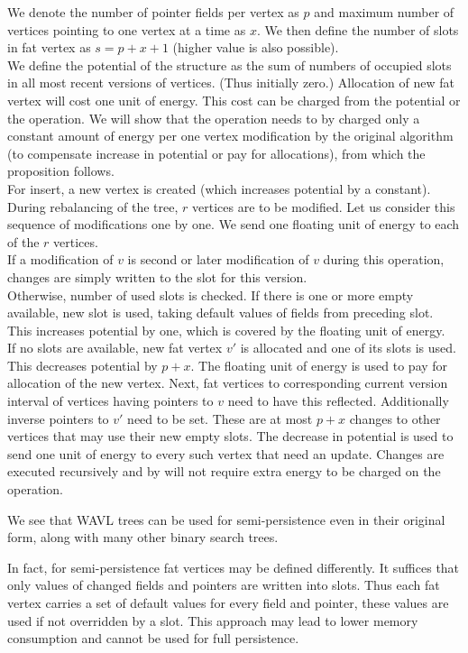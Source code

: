 \begin{myproof}
We denote the number of pointer fields per vertex as $p$ and maximum number of vertices pointing to one vertex at a time as $x$. We then define the number of slots in fat vertex as $s = p + x + 1$ (higher value is also possible).\\
We define the potential of the structure as the sum of numbers of occupied slots in all most recent versions of vertices. (Thus initially zero.) Allocation of new fat vertex will cost one unit of energy. This cost can be charged from the potential or the operation. We will show that the operation needs to by charged only a constant amount of energy per one vertex modification by the original algorithm (to compensate increase in potential or pay for allocations), from which the proposition follows.\\
For insert, a new vertex is created (which increases potential by a constant). During rebalancing of the tree, $r$ vertices are to be modified. Let us consider this sequence of modifications one by one. We send one floating unit of energy to each of the $r$ vertices.\\
If a modification of $v$ is second or later modification of $v$ during this operation, changes are simply written to the slot for this version.\\
Otherwise, number of used slots is checked. If there is one or more empty available, new slot is used, taking default values of fields from preceding slot. This increases potential by one, which is covered by the floating unit of energy.\\
If no slots are available, new fat vertex $v'$ is allocated and one of its slots is used. This decreases potential by $p+x$. The floating unit of energy is used to pay for allocation of the new vertex. Next, fat vertices to corresponding current version interval of vertices having pointers to $v$ need to have this reflected. Additionally inverse pointers to $v'$ need to be set. These are at most $p+x$ changes to other vertices that may use their new empty slots. The decrease in potential is used to send one unit of energy to every such vertex that need an update. Changes are executed recursively and by will not require extra energy to be charged on the operation.
\end{myproof}

We see that WAVL trees can be used for semi-persistence even in their original form, along with many other binary search trees.

In fact, for semi-persistence fat vertices may be defined differently. It suffices that only values of changed fields and pointers are written into slots. Thus each fat vertex carries a set of default values for every field and pointer, these values are used if not overridden by a slot. This approach may lead to lower memory consumption and cannot be used for full persistence.

